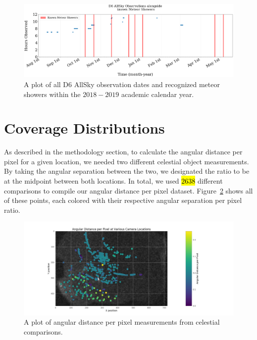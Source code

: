 \begin{figure}[ht!]
  \centering
  \includegraphics[scale=0.25]{images/nights_observed_with_meteorshowers.png}
  \caption{A plot of all D6 AllSky observation dates and recognized meteor showers within the $2018-2019$ academic calendar year.}
  \label{dateplot}
\end{figure}




\section{Coverage Distributions}

As described in the methodology section, to calculate the angular distance per pixel for a given location, we needed two different celestial object measurements.
By taking the angular separation between the two, we designated the ratio to be at the midpoint between both locations.  
In total, we used \hl{$2638$} different comparisons to compile our angular distance per pixel dataset.  
Figure~\ref{angperpix1} shows all of these points, each colored with their respective angular separation per pixel ratio.  

\begin{figure}[ht!]
  \centering
  \includegraphics[scale=0.4]{images/angular_distance_at_various_locations.png}
  \caption{A plot of angular distance per pixel measurements from celestial comparisons. }
  \label{angperpix1}
\end{figure}

